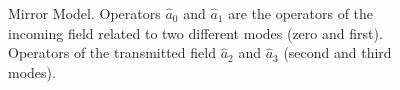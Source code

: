 \begin{figure}
\centering



\caption{Mirror Model. Operators $\hat{a}_0$ and 
$\hat{a}_1$ are the operators of the incoming field related to two different modes
(zero and first). Operators of the transmitted field $\hat{a}_2$ and 
$\hat{a}_3$ (second and third modes).}
\label{figPart2Interfero_2}
\end{figure}